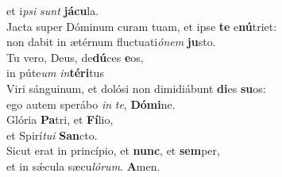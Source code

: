 \evenverse et i\textit{psi} \textit{sunt} \textbf{já}\textbf{cu}la.\\
\oddverse Jacta super Dóminum curam tuam, et ipse \textbf{te} e\textbf{nú}triet:~\*\\
\oddverse non dabit in ætérnum fluctuati\textit{ó}\textit{nem} \textbf{ju}sto.\\
\evenverse Tu vero, Deus, de\textbf{dú}ces \textbf{e}os,~\*\\
\evenverse in púte\textit{um} \textit{in}\textbf{té}\textbf{ri}tus\\
\oddverse Viri sánguinum, et dolósi non dimidiábunt \textbf{di}es \textbf{su}os:~\*\\
\oddverse ego autem sperábo \textit{in} \textit{te}, \textbf{Dó}\textbf{mi}ne.\\
\evenverse Glória \textbf{Pa}tri, et \textbf{Fí}lio,~\*\\
\evenverse et Spirí\textit{tu}\textit{i} \textbf{San}cto.\\
\oddverse Sicut erat in princípio, et \textbf{nunc}, et \textbf{sem}per,~\*\\
\oddverse et in sǽcula sæcu\textit{ló}\textit{rum}. \textbf{A}men.\\
